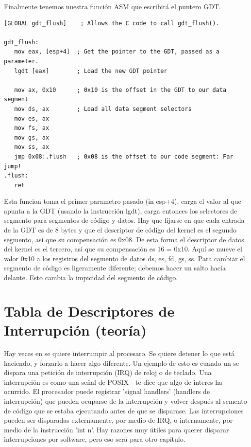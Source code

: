 \documentclass{report}
\begin{document}
Finalmente tenemos nuestra función ASM que escribirá el puntero GDT.

\begin{lstlisting}
[GLOBAL gdt_flush]    ; Allows the C code to call gdt_flush().

gdt_flush:
   mov eax, [esp+4]  ; Get the pointer to the GDT, passed as a parameter.
   lgdt [eax]        ; Load the new GDT pointer

   mov ax, 0x10      ; 0x10 is the offset in the GDT to our data segment
   mov ds, ax        ; Load all data segment selectors
   mov es, ax
   mov fs, ax
   mov gs, ax
   mov ss, ax
   jmp 0x08:.flush   ; 0x08 is the offset to our code segment: Far jump!
.flush:
   ret
\end{lstlisting}

Esta funcion toma el primer parametro pasado (in esp+4), carga el valor al que apunta a la GDT (usando la instrucción lgdt), carga entonces los selectores de segmento para segmentos de código y datos. Hay que fijarse en que cada entrada de la GDT es de 8 bytes y que el descriptor de código del kernel es el segundo segmento, así que su compensación es 0x08. De esta forma el descriptor de datos del kernel es el tercero, así que su compensación es 16 = 0x10. Aquí se mueve el valor 0x10 a los registros del segmento de datos ds, es, fd, gs, ss. Para cambiar el segmento de código es ligeramente diferente; debemos hacer un salto hacía delante. Esto cambia la impicidad del segmento de código.

\section{Tabla de Descriptores de Interrupción (teoría)}

Hay veces en se quiere interrumpir al procesaro. Se quiere detener lo que está haciendo, y forzarlo a hacer algo diferente. Un ejemplo de esto es cuando un se dispara una petición de interrupción (IRQ) de reloj o de teclado. Una interrupción es como una señal de POSIX - te dice que algo de interes ha ocurrido. El procesador puede registrar 'signal handlers' (handlers de interrupción) que pueden ocuparse de la interrupción y volver después al semento de código que se estaba ejecutando antes de que se disparase. Las interrupciones pueden ser disparadas externamente, por medio de IRQ, o internamente, por medio de la instrucción 'int n'. Hay razones muy útiles para querer disparar interrupciones por software, pero eso será para otro capítulo.
\end{document}

